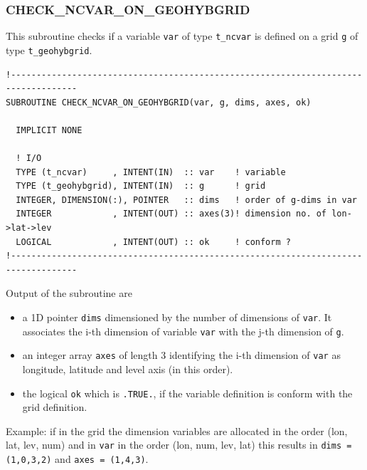 \documentclass[11pt,twoside]{article}
\begin{document}
\subsubsection{CHECK\_NCVAR\_ON\_GEOHYBGRID\label{CHKVARONGRID}}
This subroutine checks if a variable \verb|var| of type \verb|t_ncvar|
is defined on a grid \verb|g| of type \verb|t_geohybgrid|.
\begin{verbatim}
!-----------------------------------------------------------------------------------
SUBROUTINE CHECK_NCVAR_ON_GEOHYBGRID(var, g, dims, axes, ok)

  IMPLICIT NONE

  ! I/O
  TYPE (t_ncvar)     , INTENT(IN)  :: var    ! variable
  TYPE (t_geohybgrid), INTENT(IN)  :: g      ! grid
  INTEGER, DIMENSION(:), POINTER   :: dims   ! order of g-dims in var
  INTEGER            , INTENT(OUT) :: axes(3)! dimension no. of lon->lat->lev
  LOGICAL            , INTENT(OUT) :: ok     ! conform ?
!-----------------------------------------------------------------------------------
\end{verbatim}
Output of the subroutine are 
\begin{itemize}
\item a 1D pointer \verb|dims| dimensioned by the number of dimensions
of \verb|var|. It associates the i-th dimension of
variable \verb|var| with the j-th dimension of \verb|g|.
\item an integer array \verb|axes| of length 3 identifying the i-th
dimension of \verb|var| as longitude, latitude and level axis (in this order).
\item the logical \verb|ok| which is \verb|.TRUE.|, if the variable definition
is conform with the grid definition.
\end{itemize}

Example: if in the grid the dimension variables are allocated in the order
(lon, lat, lev, num) and in \verb|var| in the order (lon, num, lev, lat) 
this results in \verb|dims =(1,0,3,2)| and  \verb|axes = (1,4,3)|.
\end{document}

